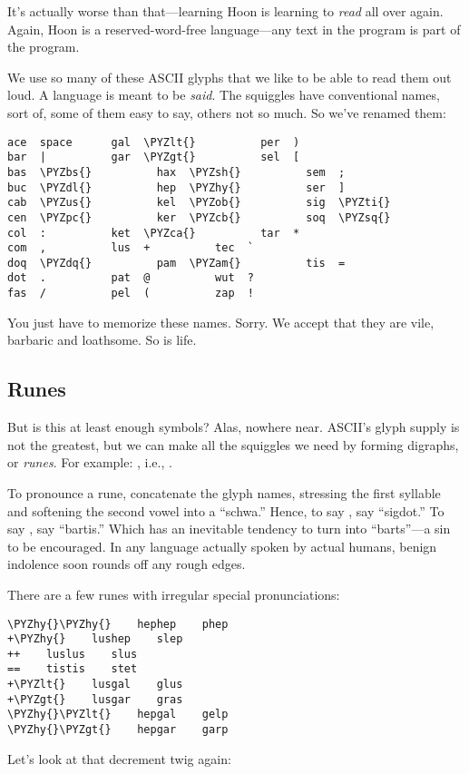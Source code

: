 It's actually worse than that---learning Hoon is learning to
\emph{read} all over again.  Again, Hoon is a reserved-word-free
language---any text in the program is part of the program.

We use so many of these ASCII glyphs that we like to be able
to read them out loud.  A language is meant to be \emph{said}.  The
squiggles have conventional names, sort of, some of them easy to
say, others not so much.  So we've renamed them:

\begin{framed_shaded}
\begin{Verbatim}[fontsize=\relsize{-2.5},fontseries=b,commandchars=\\\{\}]
ace  space      gal  \PYZlt{}          per  )
bar  |          gar  \PYZgt{}          sel  [
bas  \PYZbs{}          hax  \PYZsh{}          sem  ;
buc  \PYZdl{}          hep  \PYZhy{}          ser  ]
cab  \PYZus{}          kel  \PYZob{}          sig  \PYZti{}
cen  \PYZpc{}          ker  \PYZcb{}          soq  \PYZsq{}
col  :          ket  \PYZca{}          tar  *
com  ,          lus  +          tec  `
doq  \PYZdq{}          pam  \PYZam{}          tis  =
dot  .          pat  @          wut  ?
fas  /          pel  (          zap  !
\end{Verbatim}
\end{framed_shaded}
You just have to memorize these names.  Sorry.  We accept
that they are vile, barbaric and loathsome.  So is life.

\subsection{Runes}

But is this at least enough symbols?  Alas, nowhere near.
ASCII's glyph supply is not the greatest, but we can make all the
squiggles we need by forming digraphs, or \emph{runes}.  For example:
, i.e., \kode{\textbar{}=}.  

To pronounce a rune, concatenate the glyph names, stressing the
first syllable and softening the second vowel into a ``schwa.''
Hence, to say , say ``sigdot.''  To say \kode{\textbar{}=}, say ``bartis.''
Which has an inevitable tendency to turn into ``barts''---a sin
to be encouraged.  In any language actually spoken by actual
humans, benign indolence soon rounds off any rough edges.

There are a few runes with irregular special pronunciations:

\begin{framed_shaded}
\begin{Verbatim}[fontsize=\relsize{-2.5},fontseries=b,commandchars=\\\{\}]
\PYZhy{}\PYZhy{}    hephep    phep    
+\PYZhy{}    lushep    slep
++    luslus    slus
==    tistis    stet
+\PYZlt{}    lusgal    glus
+\PYZgt{}    lusgar    gras
\PYZhy{}\PYZlt{}    hepgal    gelp
\PYZhy{}\PYZgt{}    hepgar    garp     
\end{Verbatim}
\end{framed_shaded}
Let's look at that decrement twig again:

